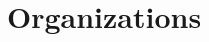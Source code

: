 \documentclass[10pt, letterpaper]{article}
\newenvironment{highlights}{
    \begin{itemize}[
        topsep=0.10 cm,
        parsep=0.10 cm,
        partopsep=0pt,
        itemsep=0pt,
        leftmargin=0.4 cm + 10pt
    ]
}{
    \end{itemize}
}
\newenvironment{twocolentry}[2][]{
    \onecolentry
    \def\secondColumn{#2}
    \setcolumnwidth{\fill, 4.5 cm}
    \begin{paracol}{2}
}{
    \switchcolumn \raggedleft \secondColumn
    \end{paracol}
    \endonecolentry
}
\let\hrefWithoutArrow\href
\renewcommand{\href}[2]{%
  \hrefWithoutArrow{#1}{\ifthenelse{\equal{#2}{}}{}{#2 }\raisebox{.15ex}{\footnotesize \faExternalLink*}}%
}
\begin{document}

    \section{Organizations}
\end{document}
